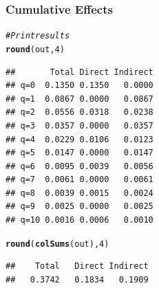\documentclass[english,10pt]{beamer}\usepackage[]{graphicx}\usepackage[]{xcolor}
\makeatletter
\newcommand{\hlnum}[1]{\textcolor[rgb]{0.686,0.059,0.569}{#1}}%
\newcommand{\hlcom}[1]{\textcolor[rgb]{0.678,0.584,0.686}{\textit{#1}}}%
\newcommand{\hldef}[1]{\textcolor[rgb]{0.345,0.345,0.345}{#1}}%
\newcommand{\hlkwd}[1]{\textcolor[rgb]{0.737,0.353,0.396}{\textbf{#1}}}%
\newenvironment{kframe}{%
 \def\at@end@of@kframe{}%
 \ifinner\ifhmode%
  \def\at@end@of@kframe{\end{minipage}}%
  \begin{minipage}{\columnwidth}%
 \fi\fi%
 \def\FrameCommand##1{\hskip\@totalleftmargin \hskip-\fboxsep
 \colorbox{shadecolor}{##1}\hskip-\fboxsep
     \hskip-\linewidth \hskip-\@totalleftmargin \hskip\columnwidth}%
 \MakeFramed {\advance\hsize-\width
   \@totalleftmargin\z@ \linewidth\hsize
   \@setminipage}}%
 {\par\unskip\endMakeFramed%
 \at@end@of@kframe}
\newenvironment{knitrout}{}{} %
\makeatother
\begin{document}
\begin{frame}[fragile]
  \frametitle{Cumulative Effects}
  \scriptsize
\begin{knitrout}
\color{fgcolor}\begin{kframe}
\begin{alltt}
\hlcom{# Print results}
\hlkwd{round}\hldef{(out,} \hlnum{4}\hldef{)}
\end{alltt}
\begin{verbatim}
##       Total Direct Indirect
## q=0  0.1350 0.1350   0.0000
## q=1  0.0867 0.0000   0.0867
## q=2  0.0556 0.0318   0.0238
## q=3  0.0357 0.0000   0.0357
## q=4  0.0229 0.0106   0.0123
## q=5  0.0147 0.0000   0.0147
## q=6  0.0095 0.0039   0.0056
## q=7  0.0061 0.0000   0.0061
## q=8  0.0039 0.0015   0.0024
## q=9  0.0025 0.0000   0.0025
## q=10 0.0016 0.0006   0.0010
\end{verbatim}
\begin{alltt}
\hlkwd{round}\hldef{(}\hlkwd{colSums}\hldef{(out),} \hlnum{4}\hldef{)}
\end{alltt}
\begin{verbatim}
##    Total   Direct Indirect 
##   0.3742   0.1834   0.1909
\end{verbatim}
\end{kframe}
\end{knitrout}
\end{frame}
\end{document}
